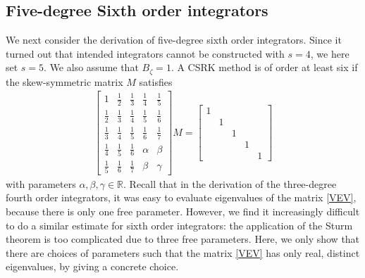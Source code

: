 \documentclass[final,leqno,onefignum,onetabnum]{siamltex1213}
\begin{document}
\subsection{Five-degree Sixth order integrators}
We next consider the derivation of five-degree sixth order integrators.
Since it turned out that
intended integrators cannot be constructed with $s=4$,
we here set $s=5$.
We also assume that $B_\zeta = 1$.
A CSRK method is of order at least six
if the skew-symmetric matrix $M$ satisfies
\begin{align}
\begin{bmatrix}
1 & \frac{1}{2} & \frac{1}{3} & \frac{1}{4} & \frac{1}{5} \\
\frac{1}{2} & \frac{1}{3} & \frac{1}{4} & \frac{1}{5} & \frac{1}{6} \\
\frac{1}{3} & \frac{1}{4} & \frac{1}{5} & \frac{1}{6} & \frac{1}{7} \\
\frac{1}{4} & \frac{1}{5} & \frac{1}{6} & \alpha & \beta \\
\frac{1}{5} & \frac{1}{6} & \frac{1}{7} & \beta & \gamma
\end{bmatrix}
M =
\begin{bmatrix}
1 & & & &\\ & 1 & & & \\ & & 1 & & \\ & & & 1 & \\ & & & & 1
\end{bmatrix}
\end{align}
with parameters $\alpha,\beta,\gamma \in {\mathbb R}$.
Recall that in the derivation of the three-degree fourth order integrators,
it was easy to evaluate eigenvalues of the matrix \eqref{VEV},
because there is only one free parameter.
However, we find it increasingly difficult to do a similar estimate
for sixth order integrators:
the application of the Sturm theorem is too complicated 
due to three free parameters.
Here, we only show that there are choices of parameters such that 
the matrix \eqref{VEV} has only real, distinct eigenvalues,
by giving a concrete choice.
\end{document}
